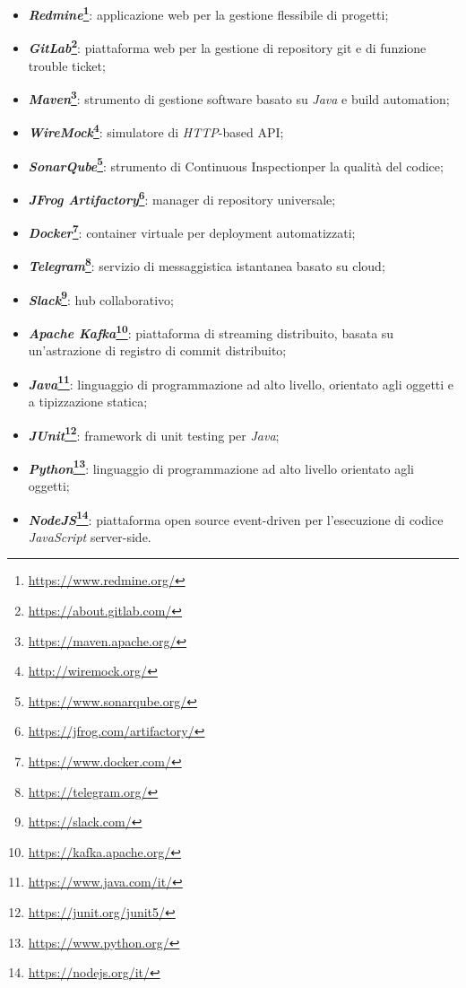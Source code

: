 	\begin{itemize}
		
		\item \textbf{\textit{Redmine}\footnote{\url{https://www.redmine.org/}}\glossario}: applicazione web per la gestione flessibile di progetti;
		\item \textbf{\textit{GitLab}\footnote{\url{https://about.gitlab.com/}}\glossario}: piattaforma web per la gestione di repository git e di funzione trouble ticket;
		\item \textbf{\textit{Maven}\footnote{\url{https://maven.apache.org/}}\glossario}: strumento di gestione software basato su \textit{Java} e build automation;
		\item \textbf{\textit{WireMock}\footnote{\url{http://wiremock.org/}}\glossario}: simulatore di \textit{HTTP}-based API;
		\item \textbf{\textit{SonarQube}\footnote{\url{https://www.sonarqube.org/}}\glossario}: strumento di Continuous Inspection\glossario per la qualità del codice;
		\item \textbf{\textit{JFrog Artifactory}\footnote{\url{https://jfrog.com/artifactory/}}\glossario}: manager di repository universale;
		\item \textbf{\textit{Docker}\footnote{\url{https://www.docker.com/}}\glossario}: container virtuale per deployment automatizzati;
		\item \textbf{\textit{Telegram}\footnote{\url{https://telegram.org/}}\glossario}: servizio di messaggistica istantanea basato su cloud;
		\item \textbf{\textit{Slack}\footnote{\url{https://slack.com/}}\glossario}: hub collaborativo;
		\item \textbf{\textit{Apache Kafka}\footnote{\url{https://kafka.apache.org/}}\glossario}: piattaforma di streaming distribuito, basata su un'astrazione di registro di commit distribuito;
		\item \textbf{\textit{Java}\footnote{\url{https://www.java.com/it/}}\glossario}:  linguaggio di programmazione ad alto livello, orientato agli oggetti e a tipizzazione statica;
		\item \textbf{\textit{JUnit}\footnote{\url{https://junit.org/junit5/}}\glossario}: framework di unit testing per \textit{Java};
		\item \textbf{\textit{Python}\footnote{\url{https://www.python.org/}}\glossario}: linguaggio di programmazione  ad alto livello orientato agli oggetti;
		\item \textbf{\textit{NodeJS}\footnote{\url{https://nodejs.org/it/}}\glossario}: piattaforma open source event-driven per l'esecuzione di codice \textit{JavaScript} server-side.
	\end{itemize}
	
